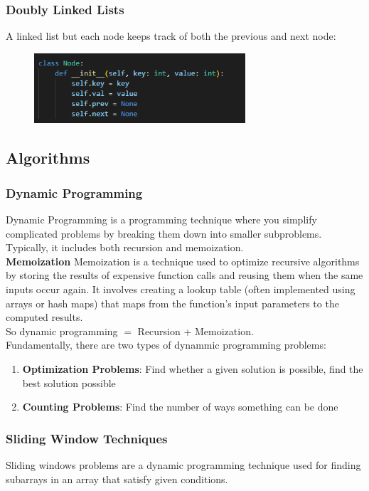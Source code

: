 \documentclass[12pt]{article}
\begin{document}
\subsubsection{Doubly Linked Lists}
A linked list but each node keeps track of  both the previous and next node:
\begin{figure}[H]
    \centering
    \includegraphics[width=0.7\textwidth]{./DLL.png} %
\end{figure}
\subsection{Algorithms}
\subsubsection{Dynamic Programming}
Dynamic Programming is a programming technique where you simplify complicated problems by breaking them down into smaller subproblems. Typically, it includes both recursion and memoization.\\


\textbf{Memoization} Memoization is a technique used to optimize recursive algorithms by storing the results of expensive function calls and reusing them when the same inputs occur again. It involves creating a lookup table (often implemented using arrays or hash maps) that maps from the function's input parameters to the computed results.\\

So dynamic programming \(=\) Recursion + Memoization. \\
Fundamentally, there are two types of dynammic programming problems:\\
\begin{enumerate}
\item \textbf{Optimization Problems}: Find whether a given solution is possible, find the best solution possible
\item \textbf{Counting Problems}: Find the number of ways something can be done
\end{enumerate}



\subsubsection{Sliding Window Techniques}
Sliding windows problems are a dynamic programming technique used for finding subarrays in an array that satisfy given conditions. \\
\end{document}
